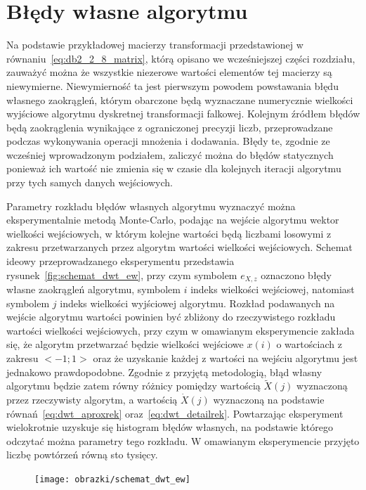 \section{Błędy własne algorytmu}

Na podstawie przykładowej macierzy transformacji przedstawionej w równaniu~\eqref{eq:db2_2_8_matrix}, którą opisano we wcześniejszej części rozdziału, zauważyć można że wszystkie niezerowe wartości elementów tej macierzy są niewymierne. Niewymierność ta jest pierwszym powodem powstawania błędu własnego zaokrągleń, którym obarczone będą wyznaczane numerycznie wielkości wyjściowe algorytmu dyskretnej transformacji falkowej. Kolejnym źródłem błędów będą zaokrąglenia wynikające z ograniczonej precyzji liczb, przeprowadzane podczas wykonywania operacji mnożenia i dodawania. Błędy te, zgodnie ze wcześniej wprowadzonym podziałem, zaliczyć można do błędów statycznych ponieważ ich wartość nie zmienia się w czasie dla kolejnych iteracji algorytmu przy tych samych danych wejściowych.

Parametry rozkładu błędów własnych algorytmu wyznaczyć można eksperymentalnie metodą Monte-Carlo, podając na wejście algorytmu wektor wielkości wejściowych, w którym kolejne wartości będą liczbami losowymi z zakresu przetwarzanych przez algorytm wartości wielkości wejściowych. Schemat ideowy przeprowadzanego eksperymentu przedstawia rysunek~\ref{fig:schemat_dwt_ew}, przy czym symbolem $e_{X,z}$ oznaczono błędy własne zaokrągleń algorytmu, symbolem $i$ indeks wielkości wejściowej, natomiast symbolem $j$ indeks wielkości wyjściowej algorytmu. Rozkład podawanych na wejście algorytmu wartości powinien być zbliżony do rzeczywistego rozkładu wartości wielkości wejściowych, przy czym w omawianym eksperymencie zakłada się, że algorytm przetwarzać będzie wielkości wejściowe $x(i)$ o wartościach z zakresu $<-1;1>$ oraz że uzyskanie każdej z wartości na wejściu algorytmu jest jednakowo prawdopodobne. Zgodnie z przyjętą metodologią, błąd własny algorytmu będzie zatem równy różnicy pomiędzy wartością $\tilde{X}(j)$ wyznaczoną przez rzeczywisty algorytm, a wartością $\dot{X}(j)$ wyznaczoną na podstawie równań~\eqref{eq:dwt_aproxrek} oraz~\eqref{eq:dwt_detailrek}. Powtarzając eksperyment wielokrotnie uzyskuje się histogram błędów własnych, na podstawie którego odczytać można parametry tego rozkładu. W omawianym eksperymencie przyjęto liczbę powtórzeń równą sto tysięcy.

\begin{figure}[htb!]
\begin{center}
\texttt{[image: obrazki/schemat\_dwt\_ew]}
\end{center}
\end{figure}

